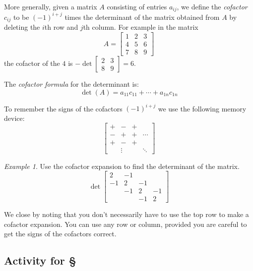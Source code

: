 \documentclass[11pt,oneside]{amsbook}
\theoremstyle{definition}
\theoremstyle{plain}
\theoremstyle{definition}
\theoremstyle{remark}
\newtheorem{example}[theorem]{Example}
\numberwithin{equation}{section}
\numberwithin{figure}{section}
\begin{document}
More generally, given a matrix $A$ consisting of entries $a_{ij}$, we define the \emph{cofactor} $c_{ij}$ to be $(-1)^{i+j}$ times the determinant of the matrix obtained from $A$ by deleting the $i$th row and $j$th column. For example in the matrix
\[A=\begin{bmatrix}1&2&3\\4&5&6\\7&8&9\end{bmatrix}
\]
the cofactor of the $4$ is $-\det\begin{bmatrix}2&3\\8&9\end{bmatrix}=6$.

The \emph{cofactor formula} for the determinant is:
\[\det(A)=a_{11}c_{11}+\cdots+a_{1n}c_{1n}
\]

To remember the signs of the cofactors $(-1)^{i+j}$ we use the following memory device:
\[\begin{bmatrix}
    +&-&+\\-&+&+&\cdots\\+&-&+\\&\vdots&&\ddots
  \end{bmatrix}
\]

\begin{example}
  Use the cofactor expansion to find the determinant of the matrix.
  \[\det\begin{bmatrix}
    2&-1\\-1&2&-1\\&-1&2&-1\\&&-1&2
  \end{bmatrix}
  \]
\end{example}

We close by noting that you don't necessarily have to use the top row to make a cofactor expansion. You can use any row or column, provided you are careful to get the signs of the cofactors correct.

\newpage
\subsection*{Activity for \S \thesection}
\end{document}
